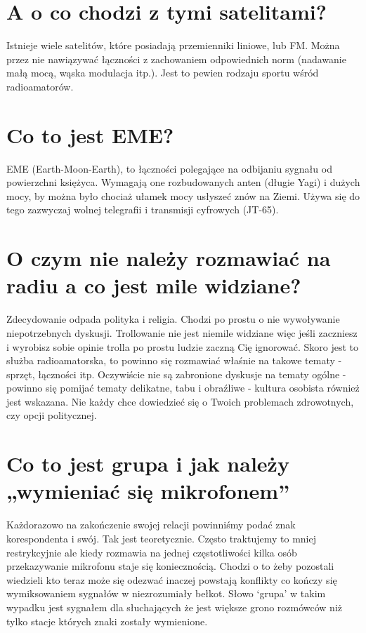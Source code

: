 \documentclass[a4paper,12pt]{article}
\begin{document}
\section{A o co chodzi z tymi satelitami?}
Istnieje wiele satelitów, które posiadają przemienniki liniowe, lub FM. Można przez nie nawiązywać łączności z zachowaniem odpowiednich norm (nadawanie małą mocą, wąska modulacja itp.). Jest to pewien rodzaju sportu wśród radioamatorów.

\section{Co to jest EME?}
EME (Earth-Moon-Earth), to łączności polegające na odbijaniu sygnału od powierzchni księżyca. Wymagają one rozbudowanych anten (długie Yagi) i dużych mocy, by można było chociaż ułamek mocy usłyszeć znów na Ziemi. Używa się do tego zazwyczaj wolnej telegrafii i transmisji cyfrowych (JT-65).

\section{O czym nie należy rozmawiać na radiu a co jest mile widziane?}
Zdecydowanie odpada polityka i religia. Chodzi po prostu o nie wywoływanie niepotrzebnych dyskusji. Trollowanie nie jest niemile widziane więc jeśli zaczniesz i wyrobisz sobie opinie trolla po prostu ludzie zaczną Cię ignorować.
Skoro jest to służba radioamatorska, to powinno się rozmawiać właśnie na takowe tematy - sprzęt, łączności itp. Oczywiście nie są zabronione dyskusje na tematy ogólne - powinno się pomijać tematy delikatne, tabu i obraźliwe - kultura osobista również jest wskazana. Nie każdy chce dowiedzieć się o Twoich problemach zdrowotnych, czy opcji politycznej.

\section{Co to jest grupa i jak należy „wymieniać się mikrofonem”}
Każdorazowo na zakończenie swojej relacji powinniśmy podać znak korespondenta i swój. Tak jest teoretycznie. Często traktujemy to mniej restrykcyjnie ale kiedy rozmawia na jednej częstotliwości kilka osób przekazywanie mikrofonu staje się koniecznością. Chodzi o to żeby pozostali wiedzieli kto teraz może się odezwać inaczej powstają konflikty co kończy się wymiksowaniem sygnałów w niezrozumiały bełkot. Słowo ‘grupa’ w takim wypadku jest sygnałem dla słuchających że jest większe grono rozmówców niż tylko stacje których znaki zostały wymienione.
\end{document}
